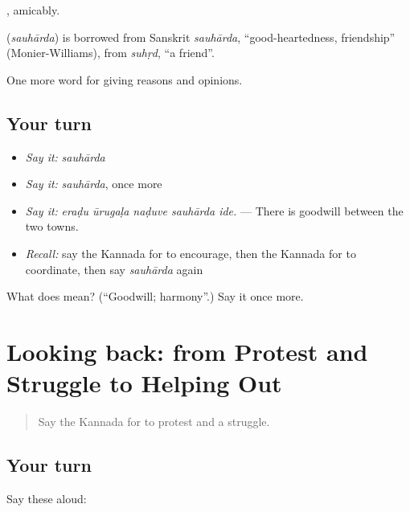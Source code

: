 , amicably.

\begin{cousinweb}
\textbf{} (\emph{sauhārda}) is borrowed from Sanskrit \emph{sauhārda}, \textquotedblleft{}good-heartedness, friendship\textquotedblright{} (Monier-Williams), from \emph{suhṛd}, \textquotedblleft{}a friend\textquotedblright{}.
\end{cousinweb}

\begin{grammarlens}[title={What you've built}]
One more word for giving reasons and opinions.
\end{grammarlens}

\subsection*{Your turn}
\begin{itemize}
\raggedright
  \item \emph{Say it:} \emph{sauhārda}
  \item \emph{Say it:} \emph{sauhārda}, once more
  \item \emph{Say it:} \emph{eraḍu ūrugaḷa naḍuve sauhārda ide.} — There is goodwill between the two towns.
  \item \emph{Recall:} say the Kannada for to encourage, then the Kannada for to coordinate, then say \emph{sauhārda} again
\end{itemize}

\begin{tcolorbox}[breakable,colback=teal!4,colframe=teal!35!black,title={Before you move on}]
What does  mean? (\textquotedblleft{}Goodwill; harmony\textquotedblright{}.) Say it once more.
\end{tcolorbox}
\section[(dialogue)]{Looking back: from Protest and Struggle to Helping Out}

\label{lesson:KA-R404-review-398-404}



\begin{quote}
Say the Kannada for to protest and a struggle.
\end{quote}

\subsection*{Your turn}
Say these aloud:


